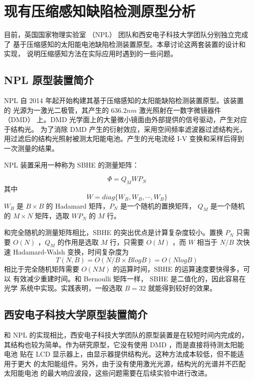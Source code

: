 \chapter{现有压缩感知缺陷检测原型分析}

目前，英国国家物理实验室 （NPL） 团队和西安电子科技大学团队分别独立完成了
基于压缩感知的太阳能电池缺陷检测装置原型。本章讨论这两套装置的设计和实现，
说明压缩感知方法在实际应用时遇到的一些问题。

\section{NPL 原型装置简介}

NPL 自 2014 年起开始构建其基于压缩感知的太阳能缺陷检测装置原型。该装置的
光源为一激光二极管，其产生的 $636.2 nm$ 激光照射在一数字微镜器件 （DMD）
上。DMD 光学面上的大量微小镜面由外部提供的信号驱动，产生对应于结构光。
为了消除 DMD 产生的衍射效应，采用空间频率滤波器过滤结构光，
用过滤后的结构光照射被测太阳能电池。产生的光电流经 I-V
变换和采样后得到一次测量的结果。

NPL 装置采用一种称为 SBHE 的测量矩阵：\cite{BlockHadamard}
\begin{definition}[SBHE 矩阵]
\begin{equation}
\Phi = Q_M W P_N
\end{equation}
其中
\begin{equation}
W = diag\{W_B, W_B, \cdots, W_B\}
\end{equation}
$W_B$ 是 $B \times B$ 的 Hadamard 矩阵，$P_N$ 是一个随机的置换矩阵，
$Q_M$ 是一个随机的 $M \times N$ 矩阵，选取 $W P_N$ 的 $M$ 行。
\end{definition}

和完全随机的测量矩阵相比，SBHE 的突出优点是计算复杂度较小。置换
$P_N$ 只需要 $O(N)$ ，$Q_M$ 的作用是选取 $M$ 行，只需要 $O(M)$ ，而
$W$ 相当于 $N/B$ 次快速 Hadamard-Walsh 变换，时间复杂度为
\begin{equation}
T(N,B) = O(N/B \times B log B) = O(NlogB)
\end{equation}
相比于完全随机矩阵需要 $O(NM)$ 的运算时间，SBHE 的运算速度要快得多，可以
有效减少重建时间。和 Bernoulli 矩阵一样， SBHE 是二值化的，因此容易在光学
系统中实现。实践表明，一般选取 $B=32$ 就能得到较好的效果。

\section{西安电子科技大学原型装置简介}

和 NPL 的实现相比，西安电子科技大学团队的原型装置是在较短时间内完成的，
其结构也较为简单。作为研究原型，它没有使用 DMD ，而是直接将待测太阳能电池
贴在 LCD 显示器上，由显示器提供结构光。这种方法成本较低，但不能适用于更大
的太阳能组件。另外，由于没有使用激光光源，结构光的光谱并不匹配太阳能电池
的最大响应波段，这些问题需要在后续实验中进行改进。

